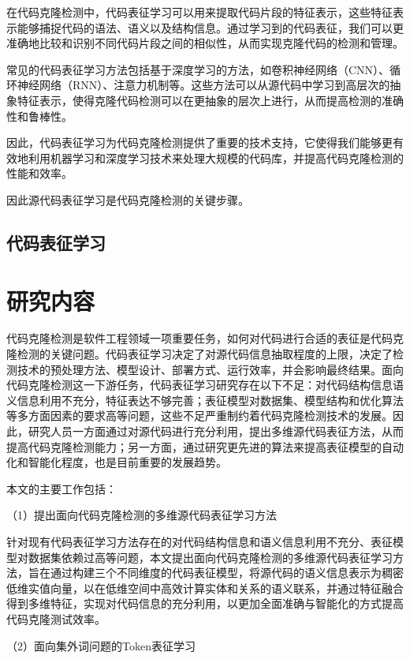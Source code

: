 在代码克隆检测中，代码表征学习可以用来提取代码片段的特征表示，这些特征表示能够捕捉代码的语法、语义以及结构信息。通过学习到的代码表征，我们可以更准确地比较和识别不同代码片段之间的相似性，从而实现克隆代码的检测和管理。

常见的代码表征学习方法包括基于深度学习的方法，如卷积神经网络（CNN）、循环神经网络（RNN）、注意力机制等。这些方法可以从源代码中学习到高层次的抽象特征表示，使得克隆代码检测可以在更抽象的层次上进行，从而提高检测的准确性和鲁棒性。

因此，代码表征学习为代码克隆检测提供了重要的技术支持，它使得我们能够更有效地利用机器学习和深度学习技术来处理大规模的代码库，并提高代码克隆检测的性能和效率。

因此源代码表征学习是代码克隆检测的关键步骤。

\subsection{代码表征学习}



\section{研究内容}

代码克隆检测是软件工程领域一项重要任务，如何对代码进行合适的表征是代码克隆检测的关键问题。代码表征学习决定了对源代码信息抽取程度的上限，决定了检测技术的预处理方法、模型设计、部署方式、运行效率，并会影响最终结果。面向代码克隆检测这一下游任务，代码表征学习研究存在以下不足：对代码结构信息语义信息利用不充分，特征表达不够完善；表征模型对数据集、模型结构和优化算法等多方面因素的要求高等问题，这些不足严重制约着代码克隆检测技术的发展。因此，研究人员一方面通过对源代码进行充分利用，提出多维源代码表征方法，从而提高代码克隆检测能力；另一方面，通过研究更先进的算法来提高表征模型的自动化和智能化程度，也是目前重要的发展趋势。

本文的主要工作包括：

（1）提出面向代码克隆检测的多维源代码表征学习方法 

针对现有代码表征学习方法存在的对代码结构信息和语义信息利用不充分、表征模型对数据集依赖过高等问题，本文提出面向代码克隆检测的多维源代码表征学习方法，旨在通过构建三个不同维度的代码表征模型，将源代码的语义信息表示为稠密低维实值向量，以在低维空间中高效计算实体和关系的语义联系，并通过特征融合得到多维特征，实现对代码信息的充分利用，以更加全面准确与智能化的方式提高代码克隆测试效率。

（2）面向集外词问题的Token表征学习

